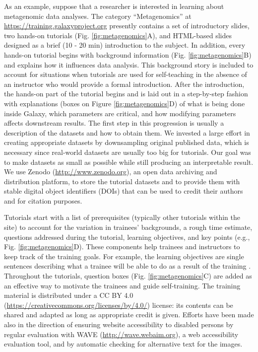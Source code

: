 As an example, suppose that a researcher is interested in learning about metagenomic data analyses. The category “Metagenomics” at  \url{https://training.galaxyproject.org} presently contains a set of introductory slides, two hands-on tutorials (Fig. \ref{fig:metagenomics}A), and HTML-based slides designed as a brief (10 - 20 min) introduction to the subject. In addition, every hands-on tutorial begins with background information (Fig. \ref{fig:metagenomics}B) and explains how it influences data analysis. This background story is included to account for situations when tutorials are used for self-teaching in the absence of an instructor who would provide a formal introduction. After the introduction, the hands-on part of the tutorial begins and is laid out in a step-by-step fashion with explanations (boxes on Figure \ref{fig:metagenomics}D) of what is being done inside Galaxy, which parameters are critical, and how modifying parameters affects downstream results. The first step in this progression is usually a description of the datasets and how to obtain them. We invested a large effort in creating appropriate datasets by downsampling original published data, which is necessary since real-world datasets are usually too big for tutorials. Our goal was to make datasets as small as possible while still producing an interpretable result. We use Zenodo (\url{http://www.zenodo.org}), an open data archiving and distribution platform, to store the tutorial datasets and to provide them with stable digital object identifiers (DOIs) that can be used to credit their authors and for citation purposes.

Tutorials start with a list of prerequisites (typically other tutorials within the site) to account for the variation in trainees’ backgrounds, a rough time estimate, questions addressed during the tutorial, learning objectives, and key points (e.g., Fig. \ref{fig:metagenomics}D). These components help trainees and instructors to keep track of the training goals. For example, the learning objectives are single sentences describing what a trainee will be able to do as a result of the training \cite{via2013best}. Throughout the tutorials, question boxes (Fig. \ref{fig:metagenomics}C) are added as an effective way to motivate the trainees \cite{dollar2007enhancing} \cite{scheines2005replacing} and guide self-training. The training material is distributed under a CC BY 4.0 (\url{https://creativecommons.org/licenses/by/4.0/}) license: its contents can be shared and adapted as long as appropriate credit is given. Efforts have been made also in the direction of ensuring website accessibility to disabled persons by regular evaluation with WAVE (\url{http://wave.webaim.org}), a web accessibility evaluation tool, and by automatic checking for alternative text for the images.

